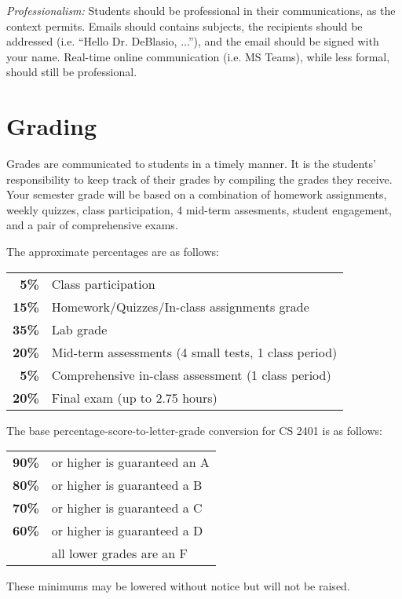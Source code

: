 \documentclass[12pt]{scrartcl}
\begin{document}
\textit{Professionalism:} 
Students should be professional in their communications, as the context permits.
Emails should contains subjects, the recipients should be addressed (i.e. ``Hello Dr. DeBlasio, ...''), and the email should be signed with your name. 
Real-time online communication (i.e. MS Teams), while less formal, should still be professional. 


\section{Grading}

Grades are communicated to students in a timely manner. 
It is the students’ responsibility to keep track of their grades by compiling the grades they receive. 
Your semester grade will be based on a combination of homework assignments, weekly quizzes, class participation, 4 mid-term assesments, student engagement, and a pair of  comprehensive exams. 

\clearpage 
The approximate percentages are as follows:
\begin{center}
\begin{tabular}{rl}
\textbf{5\% } & Class participation \\
\textbf{15\% } & Homework/Quizzes/In-class assignments grade\\
\textbf{35\% } & Lab grade\\
\textbf{20\% } & Mid-term assessments (4 small tests, 1 class period) \\
\textbf{5\% } & Comprehensive in-class assessment (1 class period)\\
\textbf{20\% } & Final exam (up to 2.75 hours)\\
\end{tabular}
\end{center}
The base percentage-score-to-letter-grade conversion for CS 2401 is as follows: 

\begin{center}
\begin{tabular}{rl}
\textbf{90\%}& or higher is guaranteed an A \\
\textbf{80\%}& or higher is guaranteed a B \\
\textbf{70\%}& or higher is guaranteed a C \\
\textbf{60\%}& or higher is guaranteed a D \\
\textbf{}& all lower grades are an F 
\end{tabular}
\end{center}
These minimums may be lowered without notice but will not be raised. 
\end{document}
